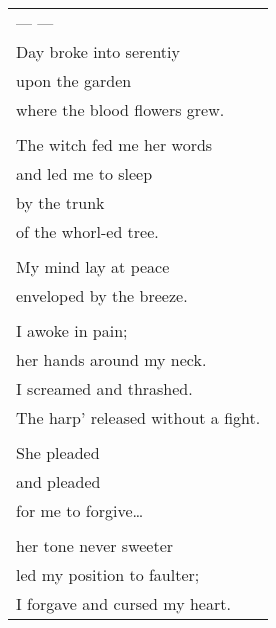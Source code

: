 \documentclass{article}
\begin{document}
\begin{tabular}{l}
\\
--- --- \\
Day broke into serentiy \\
upon the garden \\
where the blood flowers grew. \\
\\
The witch fed me her words \\
and led me to sleep \\
by the trunk \\
of the whorl-ed tree. \\
\\
My mind lay at peace \\
enveloped by the breeze. \\
\\
I awoke in pain; \\
her hands around my neck. \\
I screamed and thrashed. \\
The harp' released without a fight. \\
\\
She pleaded \\
and pleaded \\
for me to forgive\ldots{} \\
\\
her tone never sweeter \\
led my position to faulter; \\
I forgave and cursed my heart. \\
\end{tabular} \\
\end{document}
